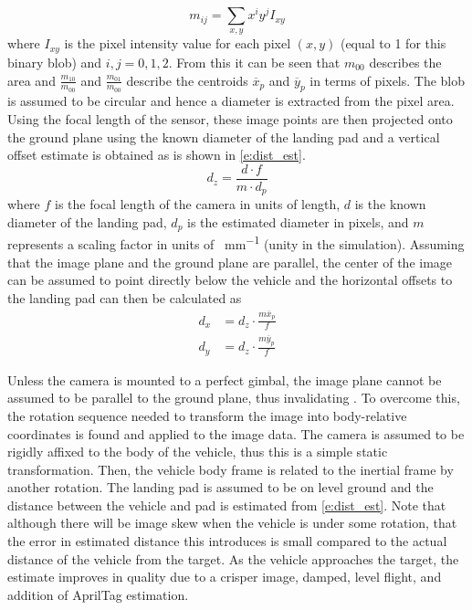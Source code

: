 \begin{equation}\label{e:im_moments}
    m_{ij}=\sum_{x,y}x^iy^jI_{xy}
\end{equation}
where $I_{xy}$ is the pixel intensity value for each pixel $(x,y)$ (equal to 1 for this binary blob) and $i,j
= 0,1,2$. From this it can be seen that $m_{00}$ describes the area and $\frac{m_{10}}{m_{00}}$ and
$\frac{m_{01}}{m_{00}}$ describe the centroids $\overline{x}_p$ and $\overline{y}_p$ in terms of
pixels\cite{hu1962visual}. The blob is assumed to be circular and hence a diameter is extracted from the pixel
area. Using the focal length of the sensor, these image points are then projected onto the ground plane using
the known diameter of the landing pad and a vertical offset estimate is obtained as is shown in
\cref{e:dist_est}.
\begin{equation}\label{e:dist_est}
    d_z=\frac{d\cdot f}{m\cdot d_p}
\end{equation}
where $f$ is the focal length of the camera in units of length, $d$ is the known diameter of the landing pad,
$d_p$ is the estimated diameter in pixels, and $m$ represents a scaling factor in units of \si{\px\per\mm}
(unity in the simulation).
Assuming that the image plane and the ground plane are parallel, the center of the image can be assumed to
point directly below the vehicle and the horizontal offsets to the landing pad can then be calculated as
\begin{align}\label{e:horiz_est}
    d_x &= d_z\cdot\frac{m\overline{x}_p}{f}\\
    d_y &= d_z\cdot\frac{m\overline{y}_p}{f}\label{e:horiz_est-y}
\end{align}

Unless the camera is mounted to a perfect gimbal, the image plane cannot be assumed to be parallel to the
ground plane, thus invalidating . To overcome this, the rotation
sequence needed to transform the image into body-relative coordinates is found and applied to the image data.
The camera is assumed to be rigidly affixed to the body of the vehicle, thus this is a simple static
transformation. Then, the vehicle body frame is related to the inertial frame by another rotation. The landing
pad is assumed to be on level ground and the distance between the vehicle and pad is estimated from
\cref{e:dist_est}. Note that although there will be image skew when the vehicle is under some rotation, that
the error in estimated distance this introduces is small compared to the actual distance of the vehicle from
the target. As the vehicle approaches the target, the estimate improves in quality due to a crisper image,
damped, level flight, and addition of AprilTag estimation.


